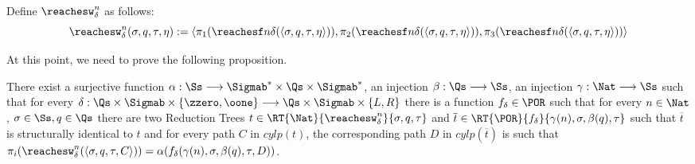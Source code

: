 \begin{conditional}{\notappendix}
  \begin{defn}
    Define $\reachesw^n_\delta$ as follows:
    \[
      \reachesw^n_\delta(\sigma, q, \tau, \eta):= \langle
      \pi_1(\reachesf n \delta(\langle \sigma, q, \tau, \eta\rangle)),
      \pi_2(\reachesf n \delta(\langle \sigma, q, \tau, \eta\rangle)),
      \pi_3(\reachesf n \delta(\langle \sigma, q, \tau, \eta\rangle))\rangle
    \]
  \end{defn}
  At this point,
  we need to prove the following proposition.

  \begin{prop}
    \label{prop:PORimplreach}
    There exist a surjective function
    $\alpha :\Ss \longrightarrow \Sigmab^* \times \Qs \times \Sigmab^*$,
    an injection $\beta :\Qs \longrightarrow \Ss$,
    an injection $\gamma: \Nat \longrightarrow \Ss$ such that
    for every $\delta: \Qs \times \Sigmab \times \{\zzero, \oone\} \longrightarrow \Qs \times \Sigmab \times \{L,R\}$
    there is a function $f_\delta \in \POR$ such that
    for every $n \in \Nat$,  $\sigma \in \Ss, q \in \Qs$ there are
    two Reduction Trees
    $t \in \RT{\Nat}{ \reachesw^n_\delta}{\sigma, q, \tau}$ and
    $\overline t \in \RT{\POR} {f_\delta} {\gamma(n),\sigma, \beta(q), \tau}$
    such that $\overline t$ is structurally identical to $t$ and
    for every path $C$ in $\mathit{cylp}(t)$,
    the corresponding path $D$ in $\mathit{cylp}(\overline t)$ is such that
    $\pi_i(\reachesw^n_\delta(\langle \sigma, q, \tau, C\rangle)) = \alpha
    (f_\delta(\gamma (n),\sigma, \beta(q), \tau, D))$.
  \end{prop}


\end{conditional}
